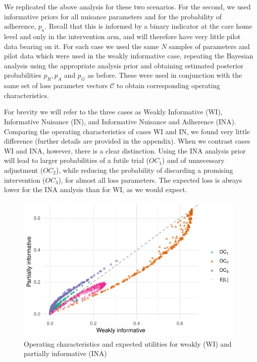 \documentclass[AMA,STIX1COL]{WileyNJD-v2}
\begin{document}
We replicated the above analysis for these two scenarios. For the second, we used informative priors for all nuisance parameters and for the probability of adherence, $p_a$. Recall that this is informed by a binary indicator at the care home level and only in the intervention arm, and will therefore have very little pilot data bearing on it. For each case we used the same $N$ samples of parameters and pilot data which were used in the weakly informative case, repeating the Bayesian analysis using the appropriate analysis prior and obtaining estimated posterior probabilities $p_R, p_A$ and $p_G$ as before. These were used in conjunction with the same set of loss parameter vectors $\mathcal{C}$ to obtain corresponding operating characteristics.

For brevity we will refer to the three cases as Weakly Informative (WI), Informative Nuisance (IN), and Informative Nuisance and Adherence (INA). Comparing the operating characteristics of cases WI and IN, we found very little difference (further details are provided in the appendix). When we contrast cases WI and INA, however, there is a clear distinction. Using the INA analysis prior will lead to larger probabilities of a futile trial ($OC_1$) and of unnecessary adjustment ($OC_2$), while reducing the probability of discarding a promising intervention ($OC_3$), for almost all loss parameters. The expected loss is always lower for the INA analysis than for WI, as we would expect.


\begin{figure}
\centering
\includegraphics[scale=0.8]{./figures/an_prior_comp}
\caption{Operating characteristics and expected utilities for weakly (WI) and partially informative (INA)}
\label{fig:an_prior_comp}
\end{figure}
\end{document}
